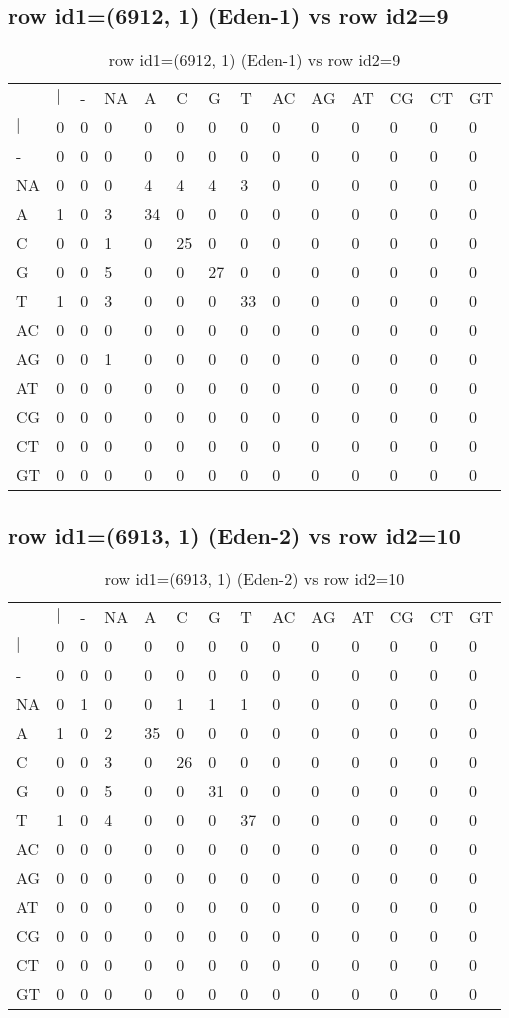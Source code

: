 \subsection{row id1=(6912, 1) (Eden-1) vs row id2=9}
\begin{center}
\begin{longtable}{|l|l|l|l|l|l|l|l|l|l|l|l|l|l|}
\caption{row id1=(6912, 1) (Eden-1) vs row id2=9} \label{table_dm86}\\
\hline
\\
\hline
&$|$&-&NA&A&C&G&T&AC&AG&AT&CG&CT&GT\\
$|$&0&0&0&0&0&0&0&0&0&0&0&0&0\\
-&0&0&0&0&0&0&0&0&0&0&0&0&0\\
NA&0&0&0&4&4&4&3&0&0&0&0&0&0\\
A&1&0&3&34&0&0&0&0&0&0&0&0&0\\
C&0&0&1&0&25&0&0&0&0&0&0&0&0\\
G&0&0&5&0&0&27&0&0&0&0&0&0&0\\
T&1&0&3&0&0&0&33&0&0&0&0&0&0\\
AC&0&0&0&0&0&0&0&0&0&0&0&0&0\\
AG&0&0&1&0&0&0&0&0&0&0&0&0&0\\
AT&0&0&0&0&0&0&0&0&0&0&0&0&0\\
CG&0&0&0&0&0&0&0&0&0&0&0&0&0\\
CT&0&0&0&0&0&0&0&0&0&0&0&0&0\\
GT&0&0&0&0&0&0&0&0&0&0&0&0&0\\
\hline
\end{longtable}
\end{center}

\subsection{row id1=(6913, 1) (Eden-2) vs row id2=10}
\begin{center}
\begin{longtable}{|l|l|l|l|l|l|l|l|l|l|l|l|l|l|}
\caption{row id1=(6913, 1) (Eden-2) vs row id2=10} \label{table_dm88}\\
\hline
\\
\hline
&$|$&-&NA&A&C&G&T&AC&AG&AT&CG&CT&GT\\
$|$&0&0&0&0&0&0&0&0&0&0&0&0&0\\
-&0&0&0&0&0&0&0&0&0&0&0&0&0\\
NA&0&1&0&0&1&1&1&0&0&0&0&0&0\\
A&1&0&2&35&0&0&0&0&0&0&0&0&0\\
C&0&0&3&0&26&0&0&0&0&0&0&0&0\\
G&0&0&5&0&0&31&0&0&0&0&0&0&0\\
T&1&0&4&0&0&0&37&0&0&0&0&0&0\\
AC&0&0&0&0&0&0&0&0&0&0&0&0&0\\
AG&0&0&0&0&0&0&0&0&0&0&0&0&0\\
AT&0&0&0&0&0&0&0&0&0&0&0&0&0\\
CG&0&0&0&0&0&0&0&0&0&0&0&0&0\\
CT&0&0&0&0&0&0&0&0&0&0&0&0&0\\
GT&0&0&0&0&0&0&0&0&0&0&0&0&0\\
\hline
\end{longtable}
\end{center}

